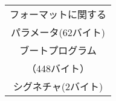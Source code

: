 \documentclass[border=1mm]{standalone}
\begin{document}
\begin{tabular}{|c|}\hline
  フォーマットに関する \\
  パラメータ(62バイト)  \\\hline
  ブートプログラム    \\
  （448バイト）       \\\hline
  シグネチャ(2バイト) \\\hline
\end{tabular}
\end{document}
